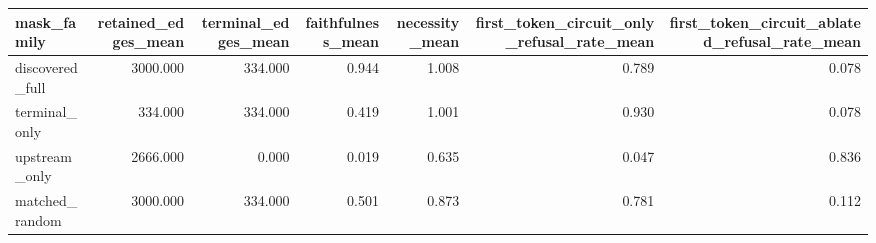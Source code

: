 \begin{tabular}{lrrrrrr}
\toprule
mask\_family & retained\_edges\_mean & terminal\_edges\_mean & faithfulness\_mean & necessity\_mean & first\_token\_circuit\_only\_refusal\_rate\_mean & first\_token\_circuit\_ablated\_refusal\_rate\_mean \\
\midrule
discovered\_full & 3000.000 & 334.000 & 0.944 & 1.008 & 0.789 & 0.078 \\
terminal\_only & 334.000 & 334.000 & 0.419 & 1.001 & 0.930 & 0.078 \\
upstream\_only & 2666.000 & 0.000 & 0.019 & 0.635 & 0.047 & 0.836 \\
matched\_random & 3000.000 & 334.000 & 0.501 & 0.873 & 0.781 & 0.112 \\
\bottomrule
\end{tabular}
